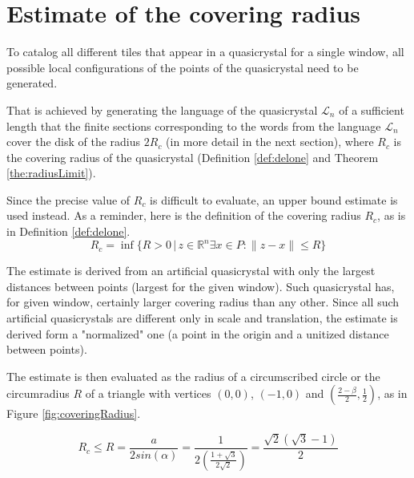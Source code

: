\documentclass[text.tex]{subfiles}
\begin{document}
\section{Estimate of the covering radius}
To catalog all different tiles that appear in a quasicrystal for a single window, all possible local configurations of the points of the quasicrystal need to be generated. 

That is achieved by generating the language of the quasicrystal $\mathcal{L}_n$ of a sufficient length that the finite sections corresponding to the words from the language $\mathcal{L}_n$ cover the disk of the radius $2R_c$ (in more detail in the next section), where $R_c$ is the covering radius of the quasicrystal (Definition \ref{def:delone} and Theorem \ref{the:radiusLimit}).

Since the precise value of $R_c$ is difficult to evaluate, an upper bound estimate is used instead. As a reminder, here is the definition of the covering radius $R_c$, as is in Definition \ref{def:delone}.
$$R_c = \inf\{R>0\,|\, z\in\mathbb{R}^n \exists x\in P: \|z-x\|\leq R\}$$

The estimate is derived from an artificial quasicrystal with only the largest distances between points (largest for the given window). Such quasicrystal has, for given window, certainly larger covering radius than any other. Since all such artificial quasicrystals are different only in scale and translation, the estimate is derived form a "normalized" one (a point in the origin and a unitized distance between points).

The estimate is then evaluated as the radius of a circumscribed circle or the circumradius $R$ of a triangle with vertices $(0,0)$, $(-1,0)$ and $\left(\frac{2-\beta}{2},\frac{1}{2}\right)$, as in Figure \ref{fig:coveringRadius}. 

$$R_c \leq R = \frac{a}{2sin(\alpha)} = \frac{1}{2\left(\frac{1+\sqrt{3}}{2\sqrt{2}}\right)} = \frac{\sqrt{2}(\sqrt{3}-1)}{2}$$
\end{document}
